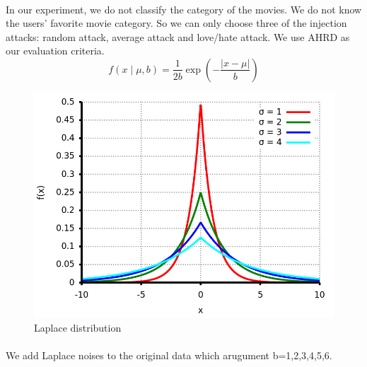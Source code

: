 \documentclass[a4paper, 12pt]{article}
\theoremstyle{definition}
\begin{document}
\paragraph{}In our experiment, we do not classify the category of the movies. We do not know the users' favorite movie category. So we can only choose three of the injection attacks: random attack, average attack and love/hate attack. We use AHRD as our evaluation criteria.
\begin{equation}
f(x\mid\mu,b) = \frac{1}{2b} \exp \left( -\frac{|x-\mu|}{b} \right)
\end{equation}
\begin{figure}[H]
	\centering
	\includegraphics[scale = 0.4]{Laplace.png}
	\caption{Laplace distribution}
\end{figure}
\paragraph{} We add Laplace noises to the original data which arugument b=1,2,3,4,5,6.\\
\end{document}
